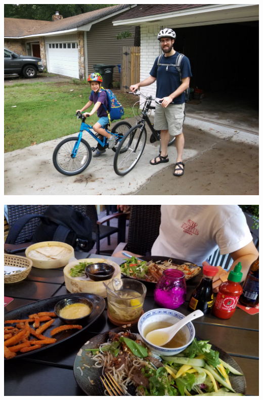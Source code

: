 \documentclass[xcolor={usenames,dvipsnames,svgnames,table},12pt]{beamer}
\begin{document}
\begin{frame}{}
  \begin{center}
    \includegraphics[width=\textwidth]{bikes.jpg}
  \end{center}
\end{frame}

\begin{frame}{}
  \begin{center}
    \includegraphics[width=\textwidth, angle=180]{mama-cook.jpg}
  \end{center}
\end{frame}
\end{document}
